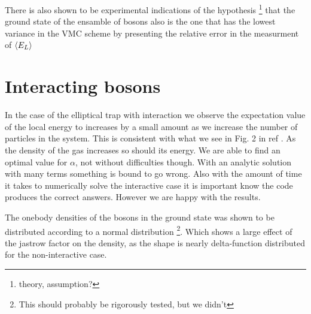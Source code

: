 There is also shown to be experimental indications of the hypothesis \footnote{theory, assumption?} that the ground state of the ensamble of bosons also is  the one that has the lowest variance in the VMC scheme by presenting the relative error in the measurment of $\langle E_L \rangle$  


\section{Interacting bosons}
In the case of the elliptical trap with interaction we observe the expectation value of the local energy to increases by a small amount as we increase the number of particles in the system. This is consistent with what we see in Fig. 2 in ref \cite{VMC}. As the density of the gas increases so should its energy. 
We are able to find an optimal value for $\alpha$, not without difficulties though. With an analytic solution with many terms something is bound to go wrong. Also with the amount of time it takes to numerically solve the interactive case it is important know the code produces the correct answers. However we are happy with the results.

The onebody densities of the bosons in the ground state was shown to be distributed according to a normal distribution  \footnote{This should probably be rigorously tested, but we didn't}. Which shows a large effect of the jastrow factor on the density, as the shape is nearly delta-function distributed for the non-interactive case. 
